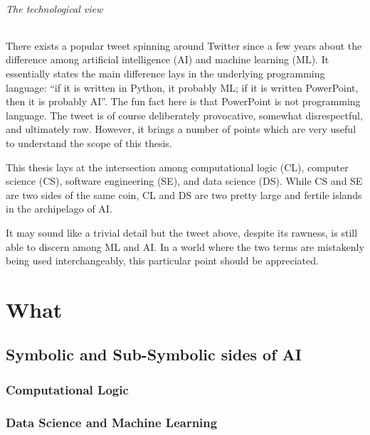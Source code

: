 \documentclass[12pt,a4paper,openright,twoside]{book}
\begin{document}
\paragraph{The technological view}

There exists a popular tweet spinning around Twitter since a few years about the difference among artificial intelligence (AI) and machine learning (ML).
%
It essentially states the main difference lays in the underlying programming language: ``if it is written in Python, it probably ML; if it is written PowerPoint, then it is probably AI''.
%
The fun fact here is that PowerPoint is not programming language.
%
The tweet is of course deliberately provocative, somewhat disrespectful, and ultimately raw.
%
However, it brings a number of points which are very useful to understand the scope of this thesis.

This thesis lays at the intersection among computational logic (CL), computer science (CS), software engineering (SE), and data science (DS).
%
While CS and SE are two sides of the same coin, CL and DS are two pretty large and fertile islands in the archipelago of AI.

It may sound like a trivial detail but the tweet above, despite its rawness, is still able to discern among ML and AI.
%
In a world where the two terms are mistakenly being used interchangeably, this particular point should be appreciated.





\part{What}
\label{part:what}

\chapter{Symbolic and Sub-Symbolic sides of AI}

\section{Computational Logic}

\cite{cco-softwarex-2021-2pkt}
\cite{Korner2020HistoryFuturePrologTPLP}

\section{Data Science and Machine Learning}
\end{document}
